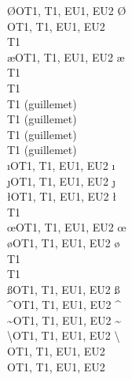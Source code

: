 \begin{tabbing}
\ttverb\O                 \>OT1, T1, EU1, EU2\>   \O  \>               \\
\ttverb\SS                \>OT1, T1, EU1, EU2\>   \SS \>               \\
\ttverb\TH                \>T1    \>   \TH \>               \\
\ttverb\ae                \>OT1, T1, EU1, EU2\>   \ae \>               \\
\ttverb\dh                \>T1    \>   \dh \>               \\
\ttverb\dj                \>T1    \>   \dj \>               \\
\ttverb\guillemotleft     \>T1    \>   \guillemotleft  \> (guillemet) \\
\ttverb\guillemotright    \>T1    \>   \guillemotright \> (guillemet) \\
\ttverb\guilsinglleft     \>T1    \>   \guilsinglleft  \> (guillemet) \\
\ttverb\guilsinglright    \>T1    \>   \guilsinglright \> (guillemet) \\
\ttverb\i                 \>OT1, T1, EU1, EU2\>   \i  \>               \\
\ttverb\j                 \>OT1, T1, EU1, EU2\>   \j  \>               \\
\ttverb\l                 \>OT1, T1, EU1, EU2\>   \l  \>               \\
\ttverb\ng                \>T1    \>   \ng \>               \\
\ttverb\oe                \>OT1, T1, EU1, EU2\>   \oe \>               \\
\ttverb\o                 \>OT1, T1, EU1, EU2\>   \o  \>               \\
\ttverb\quotedblbase      \>T1    \>   \quotedblbase   \>   \\
\ttverb\quotesinglbase    \>T1    \>   \quotesinglbase \>   \\
\ttverb\ss                \>OT1, T1, EU1, EU2\>   \ss \>               \\
\ttverb\textasciicircum   \>OT1, T1, EU1, EU2\>   \textasciicircum \>  \\
\ttverb\textasciitilde    \>OT1, T1, EU1, EU2\>   \textasciitilde  \>  \\
\ttverb\textbackslash     \>OT1, T1, EU1, EU2\>   \textbackslash   \>  \\
\ttverb\textbar           \>OT1, T1, EU1, EU2\>   \textbar         \>  \\
\ttverb\textbraceleft     \>OT1, T1, EU1, EU2\>   \textbraceleft   \>  \\

\end{tabbing}
